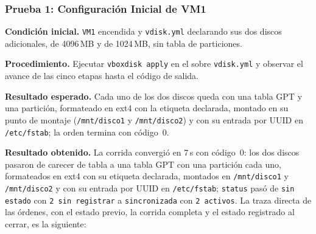 \subsubsection{Prueba 1: Configuración Inicial de VM1}
\label{subsub:prueba1}

\textbf{Condición inicial.} \texttt{VM1} encendida y \texttt{vdisk.yml} declarando sus dos discos adicionales, de 4096\,MB y de 1024\,MB, sin tabla de particiones.

\textbf{Procedimiento.} Ejecutar \texttt{vboxdisk apply} en el \host{} sobre \texttt{vdisk.yml} y observar el avance de las cinco etapas hasta el código de salida.

\textbf{Resultado esperado.} Cada uno de los dos discos queda con una tabla GPT y una partición, formateado en ext4 con la etiqueta declarada, montado en su punto de montaje (\texttt{/mnt/disco1} y \texttt{/mnt/disco2}) y con su entrada por UUID en \texttt{/etc/fstab}; la orden termina con código~0.

\textbf{Resultado obtenido.} La corrida convergió en 7\,s con código~0: los dos discos pasaron de carecer de tabla a una tabla GPT con una partición cada uno, formateados en ext4 con su etiqueta declarada, montados en \texttt{/mnt/disco1} y \texttt{/mnt/disco2} y con su entrada por UUID en \texttt{/etc/fstab}; \texttt{status} pasó de \texttt{sin estado} con \texttt{2 sin registrar} a \texttt{sincronizada} con \texttt{2 activos}. La traza directa de las órdenes, con el estado previo, la corrida completa y el estado registrado al cerrar, es la siguiente:

